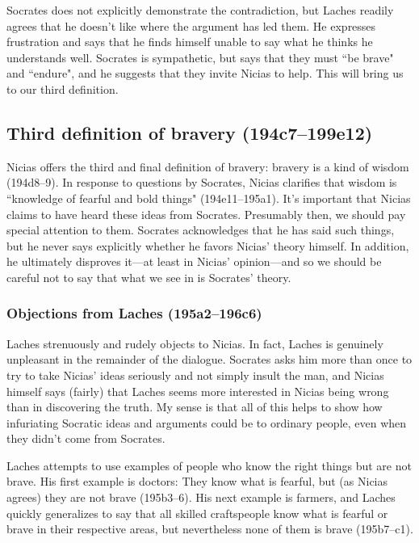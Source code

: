 \documentclass[11pt]{article}
\begin{document}
Socrates does not explicitly demonstrate the contradiction, but Laches
readily agrees that he doesn't like where the argument has led them.  He
expresses frustration and says that he finds himself unable to say what he
thinks he understands well.  Socrates is sympathetic, but says that they
must ``be brave" and ``endure", and he suggests that they invite Nicias to
help.  This will bring us to our third definition.


\subsection{Third definition of bravery (194c7--199e12)}

Nicias offers the third and final definition of bravery: bravery is a kind
of wisdom (194d8--9).  In response to questions by Socrates, Nicias
clarifies that wisdom is ``knowledge of fearful and bold things"
(194e11--195a1).  It's important that Nicias claims to have heard these
ideas from Socrates.  Presumably then, we should pay special attention to
them.  Socrates acknowledges that he has said such things, but he never
says explicitly whether he favors Nicias' theory himself.  In addition, he
ultimately disproves it---at least in Nicias' opinion---and so we should be
careful not to say that what we see in  is Socrates' theory.


\subsubsection{Objections from Laches (195a2--196c6)}

Laches strenuously and rudely objects to Nicias.  In fact, Laches is
genuinely unpleasant in the remainder of the dialogue.  Socrates asks him
more than once to try to take Nicias' ideas seriously and not simply insult
the man, and Nicias himself says (fairly) that Laches seems more interested
in Nicias being wrong than in discovering the truth.  My sense is that all
of this helps to show how infuriating Socratic ideas and arguments could be
to ordinary people, even when they didn't come from Socrates.

Laches attempts to use examples of people who know the right things but are
not brave.  His first example is doctors: They know what is fearful, but
(as Nicias agrees) they are not brave (195b3--6).  His next example is
farmers, and Laches quickly generalizes to say that all skilled
craftspeople know what is fearful or brave in their respective areas, but
nevertheless none of them is brave (195b7--c1).
\end{document}
